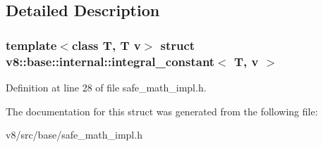 \subsection{Detailed Description}
\subsubsection*{template$<$class T, T v$>$\newline
struct v8\+::base\+::internal\+::integral\+\_\+constant$<$ T, v $>$}



Definition at line 28 of file safe\+\_\+math\+\_\+impl.\+h.



The documentation for this struct was generated from the following file\+:\begin{DoxyCompactItemize}
\item 
v8/src/base/safe\+\_\+math\+\_\+impl.\+h\end{DoxyCompactItemize}
